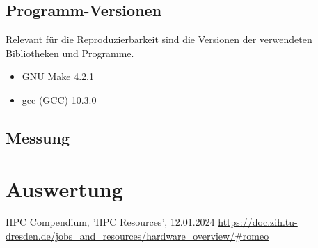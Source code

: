 \documentclass[plainarticle,zihtitle,german,final,hyperref,utf8]{zihpub}
\begin{document}
\subsection{Programm-Versionen}
Relevant für die Reproduzierbarkeit sind die Versionen der verwendeten Bibliotheken und Programme.
\begin{itemize}
	\item GNU Make 4.2.1
	\item gcc (GCC) 10.3.0
\end{itemize}

\subsection{Messung}

\section{Auswertung}


\newpage
\begin{thebibliography}{9}
	HPC Compendium, 'HPC Resources', 12.01.2024\newline
	\url{https://doc.zih.tu-dresden.de/jobs_and_resources/hardware_overview/#romeo}
\end{thebibliography}
\end{document}
